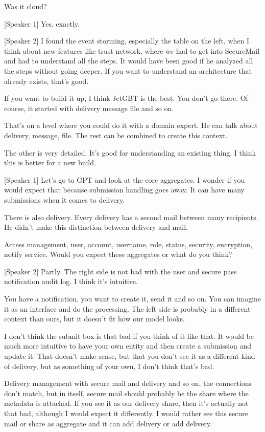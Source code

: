 Was it cloud?

[Speaker 1]
Yes, exactly.

[Speaker 2]
I found the event storming, especially the table on the left, when I think about new features like trust network, where we had to get into SecureMail and had to understand all the steps. It would have been good if he analyzed all the steps without going deeper. If you want to understand an architecture that already exists, that's good.

If you want to build it up, I think JetGBT is the best. You don't go there. Of course, it started with delivery message file and so on.

That's on a level where you could do it with a domain expert. He can talk about delivery, message, file. The rest can be combined to create this context.

The other is very detailed. It's good for understanding an existing thing. I think this is better for a new build.

[Speaker 1]
Let's go to GPT and look at the core aggregates. I wonder if you would expect that because submission handling goes away. It can have many submissions when it comes to delivery.

There is also delivery. Every delivery has a second mail between many recipients. He didn't make this distinction between delivery and mail.

Access management, user, account, username, role, status, security, encryption, notify service. Would you expect these aggregates or what do you think?

[Speaker 2]
Partly. The right side is not bad with the user and secure pass notification audit log. I think it's intuitive.

You have a notification, you want to create it, send it and so on. You can imagine it as an interface and do the processing. The left side is probably in a different context than ours, but it doesn't fit how our model looks.

I don't think the submit box is that bad if you think of it like that. It would be much more intuitive to have your own entity and then create a submission and update it. That doesn't make sense, but that you don't see it as a different kind of delivery, but as something of your own, I don't think that's bad.

Delivery management with secure mail and delivery and so on, the connections don't match, but in itself, secure mail should probably be the share where the metadata is attached. If you see it as our delivery share, then it's actually not that bad, although I would expect it differently. I would rather see this secure mail or share as aggregate and it can add delivery or add delivery.

